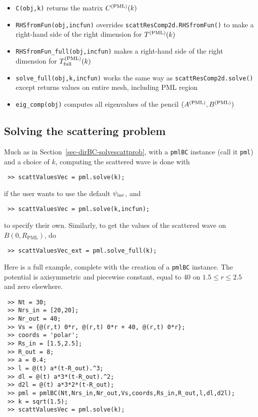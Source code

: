 \begin{description}
\begin{itemize}
    \item {\tt C(obj,k)} returns the matrix $C^{(\text{PML})}(k)$
    \item {\tt RHSfromFun(obj,incfun)} overrides {\tt scattResComp2d.RHSfromFun()}
          to make a right-hand side of the right dimension for $T^{(\text{PML})}(k)$
    \item {\tt RHSfromFun\_full(obj,incfun)} makes a right-hand side of
          the right dimension for $T^{(\text{PML})}_{\text{full}}(k)$
    \item {\tt solve\_full(obj,k,incfun)} works the same way as
          {\tt scattResComp2d.solve()} except returns values on entire
          mesh, including PML region
    \item {\tt eig\_comp(obj)} computes all eigenvalues of the pencil $(A^{(\text{PML})},B^{(\text{PML})})$
   \end{itemize}
\end{description}

\subsection{Solving the scattering problem}
\label{sec-pmlBC-solvescattprob}

Much as in Section~\ref{sec-dirBC-solvescattprob}, with a
{\tt pmlBC} instance (call it {\tt pml}) and a choice of $k$,
computing the scattered wave is done with
\begin{verbatim}
 >> scattValuesVec = pml.solve(k);
\end{verbatim}
if the user wants to use the default $\psi_{\text{inc}}$, and
\begin{verbatim}
 >> scattValuesVec = pml.solve(k,incfun);
\end{verbatim}
to specify their own. Similarly, to get the values
of the scattered wave on $B(0,R_{\text{PML}})$, do
\begin{verbatim}
 >> scattValuesVec_ext = pml.solve_full(k);
\end{verbatim}

Here is a full example, complete with the creation of a {\tt pmlBC}
instance. The potential is axisymmetric and piecewise constant, 
equal to 40 on $1.5 \le r \le 2.5$ and zero elsewhere.
\begin{verbatim}
 >> Nt = 30;
 >> Nrs_in = [20,20];
 >> Nr_out = 40;
 >> Vs = {@(r,t) 0*r, @(r,t) 0*r + 40, @(r,t) 0*r};
 >> coords = 'polar';
 >> Rs_in = [1.5,2.5];
 >> R_out = 8;
 >> a = 0.4;
 >> l = @(t) a*(t-R_out).^3;
 >> dl = @(t) a*3*(t-R_out).^2;
 >> d2l = @(t) a*3*2*(t-R_out);
 >> pml = pmlBC(Nt,Nrs_in,Nr_out,Vs,coords,Rs_in,R_out,l,dl,d2l);
 >> k = sqrt(1.5);
 >> scattValuesVec = pml.solve(k);
\end{verbatim}

